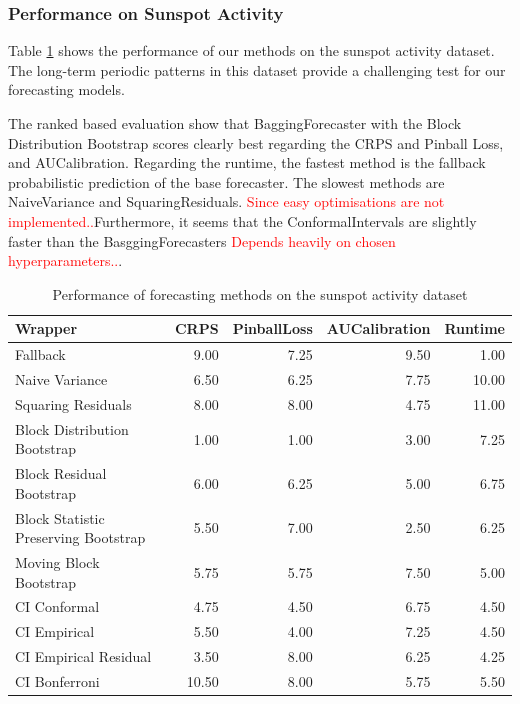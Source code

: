 \documentclass{article}
\begin{document}
\subsubsection{Performance on Sunspot Activity}
Table \ref{table:sunspot_results} shows the performance of our methods on the sunspot activity dataset. The long-term periodic patterns in this dataset provide a challenging test for our forecasting models.

The ranked based evaluation show that BaggingForecaster with the Block Distribution Bootstrap scores clearly best regarding the CRPS and Pinball Loss, and AUCalibration. Regarding the runtime, the fastest method is the fallback probabilistic prediction of the base forecaster. The slowest methods are NaiveVariance and SquaringResiduals. 
\textcolor{red}{Since easy optimisations are not implemented..}Furthermore, it seems that the ConformalIntervals are slightly faster than the BasggingForecasters \textcolor{red}{Depends heavily on chosen hyperparameters..}. 
\begin{table}[h]
    \centering
    \caption{Performance of forecasting methods on the sunspot activity dataset}
    \label{table:sunspot_results}
\begin{tabular}{lrrrr}
\toprule
Wrapper & CRPS & PinballLoss & AUCalibration & Runtime \\
\midrule
Fallback & 9.00 & 7.25 & 9.50 & 1.00 \\
Naive Variance & 6.50 & 6.25 & 7.75 & 10.00 \\
Squaring Residuals & 8.00 & 8.00 & 4.75 & 11.00 \\
Block Distribution Bootstrap & 1.00 & 1.00 & 3.00 & 7.25 \\
Block Residual Bootstrap & 6.00 & 6.25 & 5.00 & 6.75 \\
Block Statistic Preserving Bootstrap & 5.50 & 7.00 & 2.50 & 6.25 \\
Moving Block Bootstrap & 5.75 & 5.75 & 7.50 & 5.00 \\
CI Conformal & 4.75 & 4.50 & 6.75 & 4.50 \\
CI Empirical & 5.50 & 4.00 & 7.25 & 4.50 \\
CI Empirical Residual & 3.50 & 8.00 & 6.25 & 4.25 \\
CI Bonferroni  & 10.50 & 8.00 & 5.75 & 5.50 \\
\bottomrule
\end{tabular}


\end{table}
\end{document}
